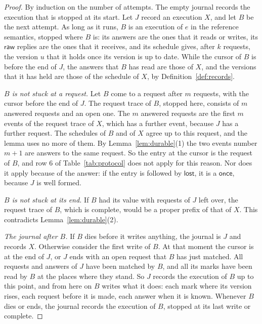 \documentclass[acmsmall,nonacm,screen]{acmart}
\newcommand{\kw}[1]{\mathsf{#1}}
\newcommand{\lost}{\kw{lost}}
\begin{document}
\begin{proof}
By induction on the number of attempts. The empty journal records the execution that is
stopped at its start. Let $J$ record an execution $X$, and let $B$ be the next attempt. As
long as it runs, $B$ is an execution of $e$ in the reference semantics, stopped where $B$
is: its answers are the ones that it reads or writes, its $\kw{raw}$ replies are the ones
that it receives, and its schedule gives, after $k$ requests, the version $u$ that it holds
once its version is up to date. While the cursor of $B$ is before the end of $J$, the answers
that $B$ has read are those of $X$, and the versions that it has held are those of the
schedule of $X$, by Definition~\ref{def:records}.

\emph{$B$ is not stuck at a request.} Let $B$ come to a request after $m$ requests, with the
cursor before the end of $J$. The request trace of $B$, stopped here, consists of $m$
answered requests and an open one. The $m$ answered requests are the first $m$ events of the
request trace of $X$, which has a further event, because $J$ has a further request. The
schedules of $B$ and of $X$ agree up to this request, and the lemma uses no more of them. By
Lemma~\ref{lem:durable}(1) the two events number $m + 1$ are answers to the same request. So
the entry at the cursor is the request of $B$, and row 6 of Table~\ref{tab:protocol} does not
apply for this reason. Nor does it apply because of the answer: if the entry is followed by
$\lost$, it is a $\kw{once}$, because $J$ is well formed.

\emph{$B$ is not stuck at its end.} If $B$ had its value with requests of $J$ left over, the
request trace of $B$, which is complete, would be a proper prefix of that of $X$. This
contradicts Lemma~\ref{lem:durable}(2).

\emph{The journal after $B$.} If $B$ dies before it writes anything, the journal is $J$ and
records $X$. Otherwise consider the first write of $B$. At that moment the cursor is at the
end of $J$, or $J$ ends with an open request that $B$ has just matched. All requests and
answers of $J$ have been matched by $B$, and all its marks have been read by $B$ at the
places where they stand. So $J$ records the execution of $B$ up to this point, and from here
on $B$ writes what it does: each mark where its version rises, each request before it is
made, each answer when it is known. Whenever $B$ dies or ends, the journal records the
execution of $B$, stopped at its last write or complete.
\end{proof}
\end{document}
